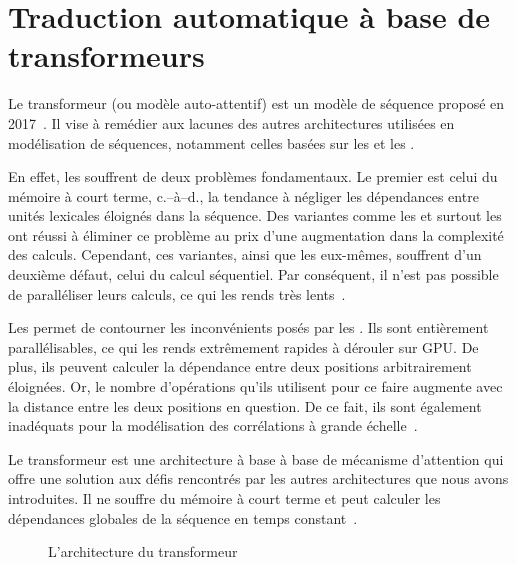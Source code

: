 \section{Traduction automatique à base de transformeurs}
\label{sec:nmt-attention}

Le transformeur (ou modèle auto-attentif) est un modèle de séquence proposé en 2017~\cite{attention}.
Il vise à remédier aux lacunes des autres architectures utilisées en modélisation de séquences, 
notamment celles basées sur les  et les .

En effet, les  souffrent de deux problèmes fondamentaux. 
Le premier est celui du mémoire à court terme, 
c.--à--d., la tendance à négliger les dépendances entre unités lexicales éloignés dans la séquence.
Des variantes comme les  et surtout les  
ont réussi à éliminer ce problème au prix d'une augmentation dans la complexité des calculs.
Cependant, ces variantes, ainsi que les  eux-mêmes, souffrent d'un deuxième défaut,
celui du calcul séquentiel.
Par conséquent, il n'est pas possible de paralléliser leurs calculs, 
ce qui les rends très lents~\cite{attention,deep-nmt-survey}.

Les  permet de contourner les inconvénients posés par les .
Ils sont entièrement parallélisables, ce qui les rends extrêmement rapides à dérouler sur GPU.
De plus, ils peuvent calculer la dépendance entre deux positions arbitrairement éloignées.
Or, le nombre d'opérations qu'ils utilisent pour ce faire 
augmente avec la distance entre les deux positions en question.
De ce fait, ils sont également inadéquats pour la modélisation des corrélations à grande échelle~\cite{deep-nmt-survey}.

Le transformeur est une architecture à base à base de mécanisme d'attention 
qui offre une solution aux défis rencontrés par les autres architectures que nous avons introduites.
Il ne souffre du mémoire à court terme 
et peut calculer les dépendances globales de la séquence en temps constant~\cite{attention}.




\begin{figure}
    \begin{center}
        
    \end{center}
    \caption[L'architecture du transformeur]
    {L'architecture du transformeur~\cite[Fig 1]{attention}}
    \label{fig:transformer}
\end{figure}
